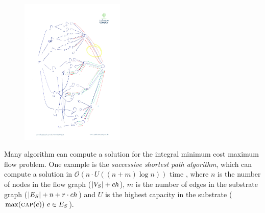 \begin{enumerate}

\end{enumerate}

\begin{figure}
\includegraphics[angle=90,origin=c, height=7cm]{figs/model_fig_skteches/flow}
\end{figure}


Many algorithm can compute a solution for the integral minimum cost maximum 
flow problem. One example is the \textit{successive shortest path algorithm}, 
which can compute a solution in $\mathcal{O}(n \cdot U((n+m)\log n)
)$ time \cite{successive_shortest_path_complexity}, where $n$ is the number of 
nodes in the flow graph ($|V_S| + ch$), $m$ is the number 
of edges in the substrate graph ($|E_S| + n + r 
\cdot ch$) and $U$ is the highest capacity in the substrate 
($\max(\textsc{cap}(e))~e\in E_S$).




